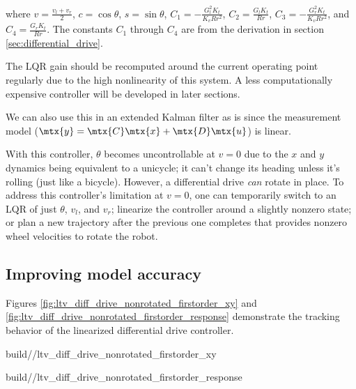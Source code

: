 \begin{theorem}
  where $v = \frac{v_l + v_r}{2}$, $c = \cos\theta$, $s = \sin\theta$,
  $C_1 = -\frac{G_l^2 K_t}{K_v R r^2}$, $C_2 = \frac{G_l K_t}{Rr}$,
  $C_3 = -\frac{G_r^2 K_t}{K_v R r^2}$, and $C_4 = \frac{G_r K_t}{Rr}$. The
  constants $C_1$ through $C_4$ are from the derivation in section
  \ref{sec:differential_drive}.

  The LQR gain should be recomputed around the current operating point regularly
  due to the high nonlinearity of this system. A less computationally expensive
  controller will be developed in later sections.
\end{theorem}

We can also use this in an extended Kalman filter as is since the measurement
model ($\mtx{y} = \mtx{C}\mtx{x} + \mtx{D}\mtx{u}$) is linear.

With this \gls{controller}, $\theta$ becomes uncontrollable at $v = 0$ due to
the $x$ and $y$ dynamics being equivalent to a unicycle; it can't change its
heading unless it's rolling (just like a bicycle). However, a differential
drive \textit{can} rotate in place. To address this controller's limitation at
$v = 0$, one can temporarily switch to an LQR of just $\theta$, $v_l$, and
$v_r$; linearize the controller around a slightly nonzero state; or plan a new
trajectory after the previous one completes that provides nonzero wheel
velocities to rotate the robot.

\subsection{Improving model accuracy}

Figures \ref{fig:ltv_diff_drive_nonrotated_firstorder_xy} and
\ref{fig:ltv_diff_drive_nonrotated_firstorder_response} demonstrate the
tracking behavior of the linearized differential drive controller.
\begin{bookfigure}
  \begin{minisvg}{2}{build/\chapterpath/ltv_diff_drive_nonrotated_firstorder_xy}
    \caption{Linear time-varying differential drive controller x-y plot
      (first-order)}
    \label{fig:ltv_diff_drive_nonrotated_firstorder_xy}
  \end{minisvg}
  \hfill
  \begin{minisvg}{2}{build/\chapterpath/ltv_diff_drive_nonrotated_firstorder_response}
    \caption{Linear time-varying differential drive controller response
      (first-order)}
    \label{fig:ltv_diff_drive_nonrotated_firstorder_response}
  \end{minisvg}
\end{bookfigure}

